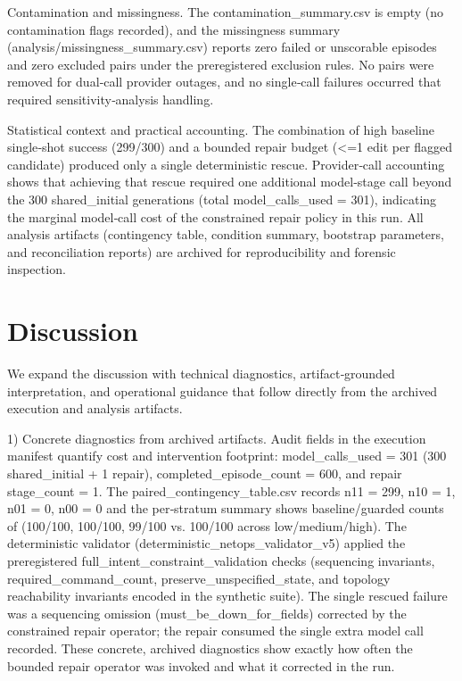 \documentclass[conference]{IEEEtran}
\begin{document}
Contamination and missingness. The contamination\_summary.csv is empty (no contamination flags recorded), and the missingness summary (analysis/missingness\_summary.csv) reports zero failed or unscorable episodes and zero excluded pairs under the preregistered exclusion rules. No pairs were removed for dual‑call provider outages, and no single‑call failures occurred that required sensitivity‑analysis handling.

Statistical context and practical accounting. The combination of high baseline single‑shot success (299/300) and a bounded repair budget (<=1 edit per flagged candidate) produced only a single deterministic rescue. Provider‑call accounting shows that achieving that rescue required one additional model‑stage call beyond the 300 shared\_initial generations (total model\_calls\_used = 301), indicating the marginal model‑call cost of the constrained repair policy in this run. All analysis artifacts (contingency table, condition summary, bootstrap parameters, and reconciliation reports) are archived for reproducibility and forensic inspection.

\section{Discussion}
We expand the discussion with technical diagnostics, artifact‑grounded interpretation, and operational guidance that follow directly from the archived execution and analysis artifacts.

1) Concrete diagnostics from archived artifacts. Audit fields in the execution manifest quantify cost and intervention footprint: model\_calls\_used = 301 (300 shared\_initial + 1 repair), completed\_episode\_count = 600, and repair stage\_count = 1. The paired\_contingency\_table.csv records n11 = 299, n10 = 1, n01 = 0, n00 = 0 and the per‑stratum summary shows baseline/guarded counts of (100/100, 100/100, 99/100 vs. 100/100 across low/medium/high). The deterministic validator (deterministic\_netops\_validator\_v5) applied the preregistered full\_intent\_constraint\_validation checks (sequencing invariants, required\_command\_count, preserve\_unspecified\_state, and topology reachability invariants encoded in the synthetic suite). The single rescued failure was a sequencing omission (must\_be\_down\_for\_fields) corrected by the constrained repair operator; the repair consumed the single extra model call recorded. These concrete, archived diagnostics show exactly how often the bounded repair operator was invoked and what it corrected in the run.
\end{document}
